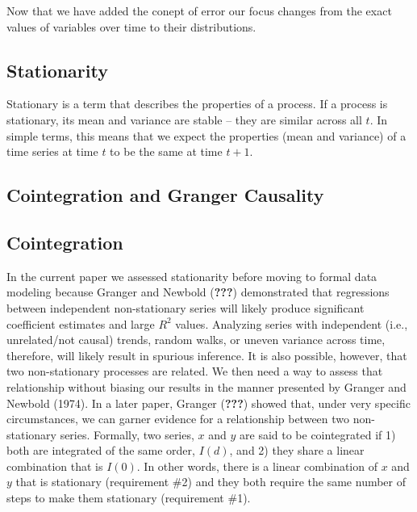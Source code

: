 \documentclass[english,,man]{apa6}
\theoremstyle{definition}
\theoremstyle{definition}
\theoremstyle{definition}
\theoremstyle{remark}
\begin{document}
Now that we have added the conept of error our focus changes from the
exact values of variables over time to their distributions.

\hypertarget{stationarity}{%
\subsection{Stationarity}\label{stationarity}}

Stationary is a term that describes the properties of a process. If a
process is stationary, its mean and variance are stable -- they are
similar across all \(t\). In simple terms, this means that we expect the
properties (mean and variance) of a time series at time \(t\) to be the
same at time \(t+1\).

\hypertarget{cointegration-and-granger-causality}{%
\subsection{Cointegration and Granger
Causality}\label{cointegration-and-granger-causality}}

\hypertarget{cointegration}{%
\subsection{Cointegration}\label{cointegration}}

In the current paper we assessed stationarity before moving to formal
data modeling because Granger and Newbold ({\textbf{???}}) demonstrated
that regressions between independent non-stationary series will likely
produce significant coefficient estimates and large \(R^2\) values.
Analyzing series with independent (i.e., unrelated/not causal) trends,
random walks, or uneven variance across time, therefore, will likely
result in spurious inference. It is also possible, however, that two
non-stationary processes are related. We then need a way to assess that
relationship without biasing our results in the manner presented by
Granger and Newbold (1974). In a later paper, Granger ({\textbf{???}})
showed that, under very specific circumstances, we can garner evidence
for a relationship between two non-stationary series. Formally, two
series, \(x\) and \(y\) are said to be cointegrated if 1) both are
integrated of the same order, \(I(d)\), and 2) they share a linear
combination that is \(I(0)\). In other words, there is a linear
combination of \(x\) and \(y\) that is stationary (requirement \#2) and
they both require the same number of steps to make them stationary
(requirement \#1).
\end{document}
